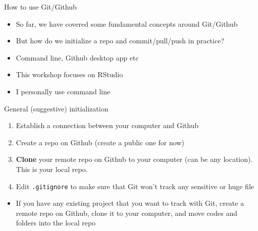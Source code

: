 \documentclass[handout,pdftex,10pt,aspectratio=169]{beamer}
\begin{document}
\begin{frame}{How to use Git/Github}
  \begin{itemize}[<+->]
    \item So far, we have covered some fundamental concepts around Git/Github
    \item But how do we initialize a repo and commit/pull/push in practice?
    \item Command line, Github desktop app etc
    \item This workshop focuses on RStudio
    \item I personally use command line
  \end{itemize}
\end{frame}


\begin{frame}{General (suggestive) initialization}
  \begin{enumerate}[<+->]
    \item Establish a connection between your computer and Github
    \item Create a repo on Github (create a public one for now)
    \item \textbf{Clone} your remote repo on Github to your computer (can be any location).
    This is your local repo.
    \item Edit \texttt{.gitignore} to make sure that Git won't track any sensitive or huge file
  \end{enumerate}
  \medskip
  \begin{itemize}[<+->]
    \item If you have any existing project that you want to track with Git, create a remote repo 
    on Github, clone it to your computer, and move codes and folders into the local repo
  \end{itemize}
\end{frame}
\end{document}

